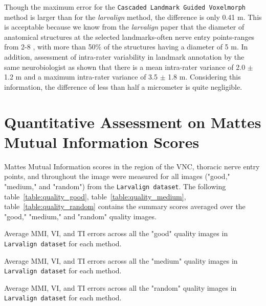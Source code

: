 \documentclass{book}
\begin{document}
	Though the maximum error for the \texttt{Cascaded Landmark Guided Voxelmorph} method is larger than for the \textit{larvalign} method, the difference is only 0.41 \textmu m. This is acceptable because we know from the \textit{larvalign} paper that the diameter of anatomical structures at the selected landmarks-often nerve entry points-ranges from 2-8 \textmu, with more than 50\% of the structures having a diameter of 5 m. In addition, assessment of intra-rater variability in landmark annotation by the same neurobiologist as shown that there is a mean intra-rater variance of 2.0 $\pm$ 1.2 \textmu m and a maximum intra-rater variance of 3.5 $\pm$ 1.8 \textmu m. Considering this information, the difference of less than half a micrometer is quite negligible.
	
	\section{Quantitative Assessment on Mattes Mutual Information Scores}
	Mattes Mutual Information scores in the region of the VNC, thoracic nerve entry points, and throughout the image were measured for all images ("good," "medium," and "random") from the \texttt{Larvalign dataset}. The following table~\ref{table:quality_good}, table~\ref{table:quality_medium}, table~\ref{table:quality_random} contains the summary scores averaged over the "good," "medium," and "random" quality images.
	
	\begin{table}[h!]
		\centering
		
		\caption{Average MMI, VI, and TI errors across all the "good" quality images in \texttt{Larvalign dataset} for each method.}
		\label{table:quality_good}
	\end{table}
	
	\begin{table}[h!]
		\centering
		
		\caption{Average MMI, VI, and TI errors across all the "medium" quality images in \texttt{Larvalign dataset} for each method.}
		\label{table:quality_medium}
	\end{table}
	
	\begin{table}[h!]
		\centering
		
		\caption{Average MMI, VI, and TI errors across all the "random" quality images in \texttt{Larvalign dataset} for each method.}
		\label{table:quality_random}
	\end{table}
\end{document}
